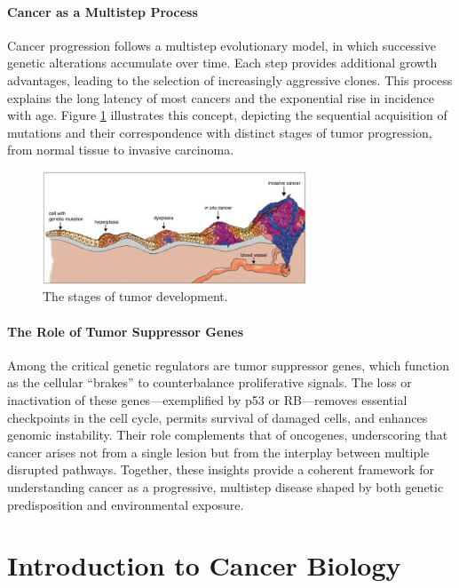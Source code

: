 \documentclass[10pt]{extarticle}
\begin{document}
\paragraph{Cancer as a Multistep Process}
Cancer progression follows a multistep evolutionary model, in which successive genetic alterations accumulate over time. Each step provides additional growth advantages, leading to the selection of increasingly aggressive clones. This process explains the long latency of most cancers and the exponential rise in incidence with age. Figure \ref{fig:stages_tumor} illustrates this concept, depicting the sequential acquisition of mutations and their correspondence with distinct stages of tumor progression, from normal tissue to invasive carcinoma.

\begin{figure}[h]
    \centering
    \includegraphics[width=0.7\textwidth]{Figures/Different_phases_of_tumor.jpg} %
    \caption{The stages of tumor development.}
    \label{fig:stages_tumor}
\end{figure}


\paragraph{The Role of Tumor Suppressor Genes}
Among the critical genetic regulators are tumor suppressor genes, which function as the cellular “brakes” to counterbalance proliferative signals. The loss or inactivation of these genes—exemplified by p53 or RB—removes essential checkpoints in the cell cycle, permits survival of damaged cells, and enhances genomic instability. Their role complements that of oncogenes, underscoring that cancer arises not from a single lesion but from the interplay between multiple disrupted pathways. Together, these insights provide a coherent framework for understanding cancer as a progressive, multistep disease shaped by both genetic predisposition and environmental exposure.

\section{Introduction to Cancer Biology}
\end{document}
